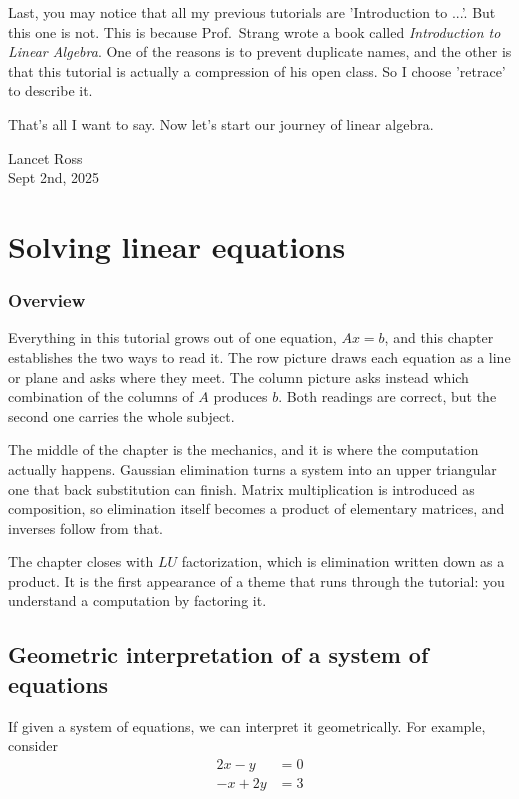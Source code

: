 \documentclass[10pt,a4paper,oneside,numbers=noenddot]{scrbook}
\theoremstyle{ctplain}
\theoremstyle{ctresult}
\begin{document}
Last, you may notice that all my previous tutorials are 'Introduction to ...'. But this one
is not. This is because Prof.\ Strang wrote a book called \textit{Introduction to Linear
Algebra}. One of the reasons is to prevent duplicate names, and the other is that this
tutorial is actually a compression of his open class. So I choose 'retrace' to describe
it.

That's all I want to say. Now let's start our journey of linear algebra.

\begin{flushright}
  Lancet Ross\\
  Sept 2nd, 2025
\end{flushright}


\linespread{1.2}\selectfont

\mainmatter

\chapter{Solving linear equations}

\subsection*{Overview}

Everything in this tutorial grows out of one equation, $Ax = b$, and this chapter
establishes the two ways to read it. The row picture draws each equation as a line or plane
and asks where they meet. The column picture asks instead which combination of the columns
of $A$ produces $b$. Both readings are correct, but the second one carries the whole
subject.

The middle of the chapter is the mechanics, and it is where the computation actually
happens. Gaussian elimination turns a system into an upper triangular one that back
substitution can finish. Matrix multiplication is introduced as composition, so elimination
itself becomes a product of elementary matrices, and inverses follow from that.

The chapter closes with $LU$ factorization, which is elimination written down as a product.
It is the first appearance of a theme that runs through the tutorial: you understand a
computation by factoring it.


\section{Geometric interpretation of a system of equations}
If given a system of equations, we can interpret it geometrically. For example, consider
\begin{equation}
    \begin{aligned}
        2x - y &= 0 \\
        -x + 2y &= 3
    \end{aligned}
\end{equation}
\end{document}
